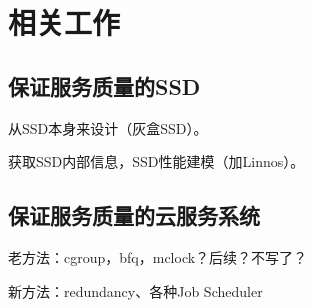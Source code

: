\section{相关工作}
\label{sec:bg-related-work}

\subsection{保证服务质量的SSD}

从SSD本身来设计（灰盒SSD）。

获取SSD内部信息，SSD性能建模（加Linnos）。

\subsection{保证服务质量的云服务系统}

老方法：cgroup，bfq，mclock？后续？不写了？

新方法：redundancy、各种Job Scheduler